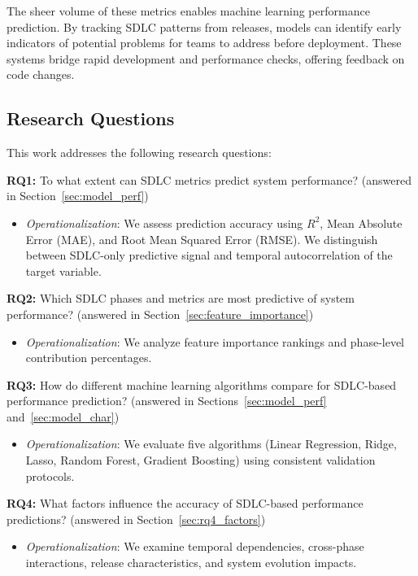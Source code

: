 \documentclass[technologies,article,submit,pdftex,moreauthors]{Definitions/mdpi}
\providecommand{\tightlist}{%
  \setlength{\itemsep}{0pt}\setlength{\parskip}{0pt}}
\begin{document}
The sheer volume of these metrics enables machine learning performance
prediction. By tracking SDLC patterns from releases, models can identify
early indicators of potential problems for teams to address before
deployment. These systems bridge rapid development and performance
checks, offering feedback on code changes.

\subsection{Research Questions}\label{sec:research_questions}

This work addresses the following research questions:

\textbf{RQ1:} To what extent can SDLC metrics predict system
performance? (answered in Section~\ref{sec:model_perf})

\begin{itemize}
\tightlist
\item
  \emph{Operationalization}: We assess prediction accuracy using
  \(R^2\), Mean Absolute Error (MAE), and Root Mean Squared Error
  (RMSE). We distinguish between SDLC-only predictive signal and
  temporal autocorrelation of the target variable.
\end{itemize}

\textbf{RQ2:} Which SDLC phases and metrics are most predictive of
system performance? (answered in
Section~\ref{sec:feature_importance})

\begin{itemize}
\tightlist
\item
  \emph{Operationalization}: We analyze feature importance rankings and
  phase-level contribution percentages.
\end{itemize}

\textbf{RQ3:} How do different machine learning algorithms compare for
SDLC-based performance prediction? (answered in
Sections~\ref{sec:model_perf}
and~\ref{sec:model_char})

\begin{itemize}
\tightlist
\item
  \emph{Operationalization}: We evaluate five algorithms (Linear
  Regression, Ridge, Lasso, Random Forest, Gradient Boosting) using
  consistent validation protocols.
\end{itemize}

\textbf{RQ4:} What factors influence the accuracy of SDLC-based
performance predictions? (answered in
Section~\ref{sec:rq4_factors})

\begin{itemize}
\tightlist
\item
  \emph{Operationalization}: We examine temporal dependencies,
  cross-phase interactions, release characteristics, and system
  evolution impacts.
\end{itemize}
\end{document}
